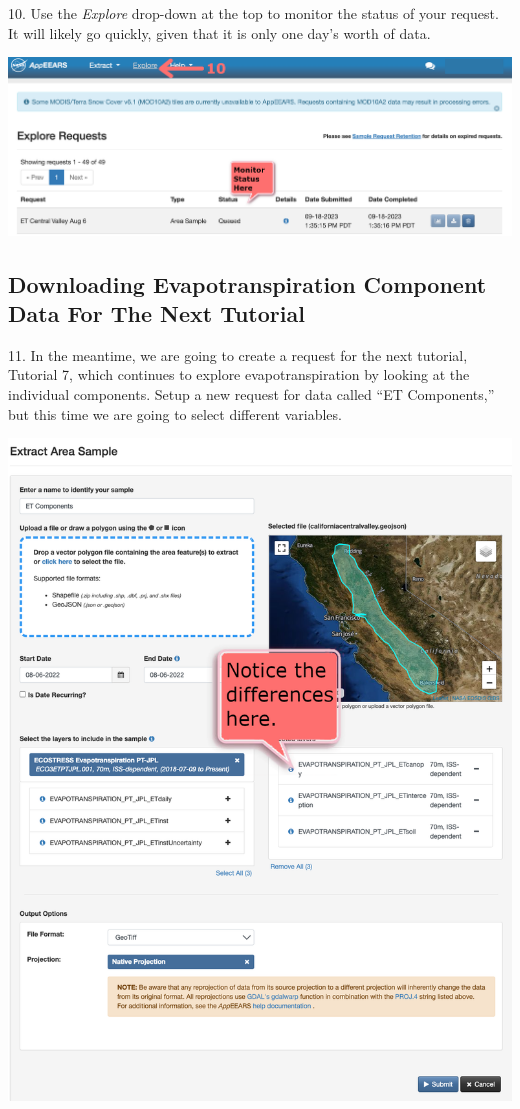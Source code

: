 \documentclass[oneside,a4paper,11pt,explicit]{book}
\begin{document}
\vspace{.5em}

10. Use the \textit{Explore} drop-down at the top to monitor the status of your request. It will likely go quickly, given that it is only one day's worth of data.

\vspace{.5em}

\centerline{\includegraphics[width=.75\textwidth]{ExploreRequest.png}}

\vspace{.5em}

\subsection{Downloading Evapotranspiration Component Data For The Next Tutorial}

11. In the meantime, we are going to create a request for the next tutorial, Tutorial 7, which continues to explore evapotranspiration by looking at the individual components. Setup a new request for data called ``ET Components,'' but this time we are going to select different variables. 

\vspace{.5em}

\centerline{\includegraphics[width=.6\textwidth]{ETcomponentRequest.png}}
\end{document}

